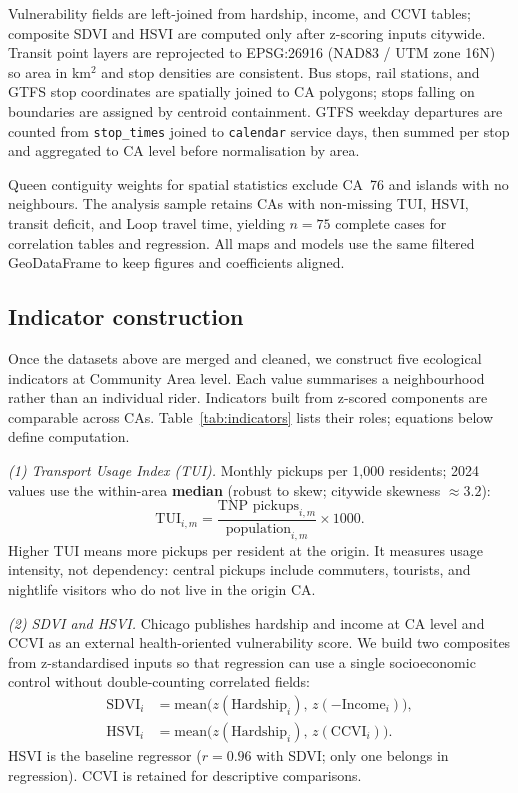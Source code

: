 \documentclass[10pt, a4paper]{article}
\begin{document}
Vulnerability fields are left-joined from hardship, income, and CCVI tables; composite SDVI and HSVI are computed only after z-scoring inputs citywide. Transit point layers are reprojected to EPSG:26916 (NAD83 / UTM zone 16N) so area in km$^2$ and stop densities are consistent. Bus stops, rail stations, and GTFS stop coordinates are spatially joined to CA polygons; stops falling on boundaries are assigned by centroid containment. GTFS weekday departures are counted from \texttt{stop\_times} joined to \texttt{calendar} service days, then summed per stop and aggregated to CA level before normalisation by area.

Queen contiguity weights for spatial statistics exclude CA~76 and islands with no neighbours. The analysis sample retains CAs with non-missing TUI, HSVI, transit deficit, and Loop travel time, yielding $n=75$ complete cases for correlation tables and regression. All maps and models use the same filtered GeoDataFrame to keep figures and coefficients aligned.

\subsection{Indicator construction}\label{sec:indicators}
Once the datasets above are merged and cleaned, we construct five ecological indicators at Community Area level. Each value summarises a neighbourhood rather than an individual rider. Indicators built from z-scored components are comparable across CAs. Table~\ref{tab:indicators} lists their roles; equations below define computation.

\textit{(1) Transport Usage Index (TUI).}
Monthly pickups per 1{,}000 residents; 2024 values use the within-area \textbf{median} (robust to skew; citywide skewness $\approx 3.2$):
\begin{equation}
    \mathrm{TUI}_{i,m} = \frac{\text{TNP pickups}_{i,m}}{\text{population}_{i,m}} \times 1000.
\end{equation}
Higher TUI means more pickups per resident at the origin. It measures usage intensity, not dependency: central pickups include commuters, tourists, and nightlife visitors who do not live in the origin CA.

\textit{(2) SDVI and HSVI.}
Chicago publishes hardship and income at CA level and CCVI as an external health-oriented vulnerability score. We build two composites from z-standardised inputs \cite{chicago_hardship,chicago_ccvi} so that regression can use a single socioeconomic control without double-counting correlated fields:
\begin{align}
    \mathrm{SDVI}_i &= \mathrm{mean}\bigl(z(\mathrm{Hardship}_i),\, z(-\mathrm{Income}_i)\bigr),\\
    \mathrm{HSVI}_i &= \mathrm{mean}\bigl(z(\mathrm{Hardship}_i),\, z(\mathrm{CCVI}_i)\bigr).
\end{align}
HSVI is the baseline regressor ($r=0.96$ with SDVI; only one belongs in regression). CCVI is retained for descriptive comparisons.
\end{document}
